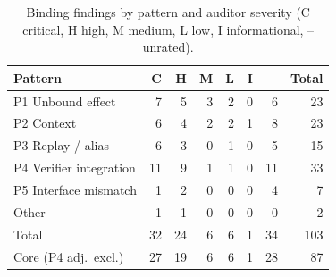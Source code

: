 \begin{table}[!htb]
\centering
\caption{Binding findings by pattern and auditor severity
(C critical, H high, M medium, L low, I informational, -- unrated).}
\label{tab:severity}
\footnotesize
\begin{tabular}{@{}lrrrrrrr@{}}
\toprule
\textbf{Pattern} & \textbf{C} & \textbf{H} & \textbf{M} & \textbf{L} & \textbf{I} & \textbf{--} & \textbf{Total} \\
\midrule
P1 Unbound effect & 7 & 5 & 3 & 2 & 0 & 6 & 23 \\
P2 Context & 6 & 4 & 2 & 2 & 1 & 8 & 23 \\
P3 Replay / alias & 6 & 3 & 0 & 1 & 0 & 5 & 15 \\
P4 Verifier integration & 11 & 9 & 1 & 1 & 0 & 11 & 33 \\
P5 Interface mismatch & 1 & 2 & 0 & 0 & 0 & 4 & 7 \\
Other & 1 & 1 & 0 & 0 & 0 & 0 & 2 \\
\midrule
Total & 32 & 24 & 6 & 6 & 1 & 34 & 103 \\
Core (P4 adj.\ excl.) & 27 & 19 & 6 & 6 & 1 & 28 & 87 \\
\bottomrule
\end{tabular}
\end{table}

